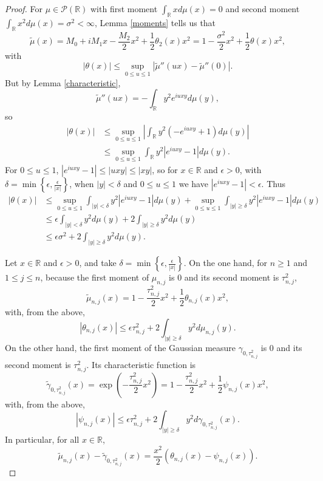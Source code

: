 \documentclass{article}
\theoremstyle{definition}
\theoremstyle{definition}
\begin{document}
\begin{proof}
For $\mu \in \mathscr{P}(\mathbb{R})$ with
first moment $\int_\mathbb{R} x d\mu(x) =0$ and
second moment $\int_\mathbb{R} x^2 d\mu(x) = \sigma^2<\infty$, 
Lemma \ref{moments} tells us that 
\[
\tilde{\mu}(x) = M_0 + iM_1x - \frac{M_2}{2} x^2 + \frac{1}{2}\theta_2(x) x^2
=1-\frac{\sigma^2}{2} x^2 + \frac{1}{2} \theta(x) x^2,
\]
with 
\[
|\theta(x)| \leq \sup_{0 \leq u \leq 1} |\tilde{\mu}''(ux) - \tilde{\mu}''(0)|.
\]
But by Lemma \ref{characteristic}, 
\[
\tilde{\mu}''(ux) = -\int_\mathbb{R} y^2 e^{iuxy} d\mu(y),
\]
so
\begin{align*}
|\theta(x)| &\leq \sup_{0 \leq u \leq 1} \left| \int_\mathbb{R} y^2 (-e^{iuxy}+1) d\mu(y) \right|\\
&\leq \sup_{0 \leq u \leq 1} \int_\mathbb{R} y^2 |e^{iuxy} - 1| d\mu(y).
\end{align*}
For $0 \leq u \leq 1$, $|e^{iuxy}-1| \leq |uxy| \leq |xy|$, so for $x \in \mathbb{R}$ and
$\epsilon>0$, with $\delta=\min\left\{\epsilon,\frac{\epsilon}{|x|}\right\}$, when
$|y| < \delta$ and $0 \leq u \leq 1$ we have
$|e^{iuxy}-1| < \epsilon$. Thus
\begin{align*}
|\theta(x)| &\leq \sup_{0 \leq u \leq 1} \int_{|y| < \delta} y^2 |e^{iuxy}-1| d\mu(y)
+\sup_{0 \leq u \leq 1} \int_{|y| \geq \delta} y^2 |e^{iuxy}-1| d\mu(y)\\
&\leq \epsilon \int_{|y|<\delta} y^2 d\mu(y) + 2 \int_{|y| \geq \delta} y^2 d\mu(y)\\
&\leq \epsilon \sigma^2 + 2 \int_{|y| \geq \delta} y^2 d\mu(y).
\end{align*}

Let  $x \in \mathbb{R}$ and $\epsilon>0$, and take $\delta = \min\left\{\epsilon,\frac{\epsilon}{|x|} \right\}$.
On the one hand, for $n \geq 1$ and $1 \leq j \leq n$,
because the first moment of $\mu_{n,j}$ is $0$ and its second moment
is $\tau_{n,j}^2$,
\[
\tilde{\mu}_{n,j}(x) = 1 - \frac{\tau_{n,j}^2}{2} x^2 + \frac{1}{2} \theta_{n,j}(x) x^2,
\]
with, from the above,  
\[
|\theta_{n,j}(x)| \leq \epsilon \tau_{n,j}^2 + 2 \int_{|y| \geq \delta} y^2 d\mu_{n,j}(y).
\]
On the other hand,
the first moment of the Gaussian measure $\gamma_{0,\tau_{n,j}^2}$ is $0$ and its
second moment is $\tau_{n,j}^2$. Its characteristic function is
\[
\tilde{\gamma}_{0,\tau_{n,j}^2}(x) = \exp\left(-\frac{\tau_{n,j}^2}{2} x^2 \right) = 1-\frac{\tau_{n,j}^2}{2}x^2+\frac{1}{2}
\psi_{n,j}(x)x^2,
\]
with, from the above,
\[
|\psi_{n,j}(x)| \leq \epsilon \tau_{n,j}^2+2\int_{|y| \geq \delta} y^2 d\gamma_{0,\tau_{n,j}^2}(x).
\]
In particular, for all $x \in \mathbb{R}$,
\[
\tilde{\mu}_{n,j}(x) - \tilde{\gamma}_{0,\tau_{n,j}^2}(x) = \frac{x^2}{2}\left(\theta_{n,j}(x)-
\psi_{n,j}(x) \right).
\]


\end{proof}
\end{document}
